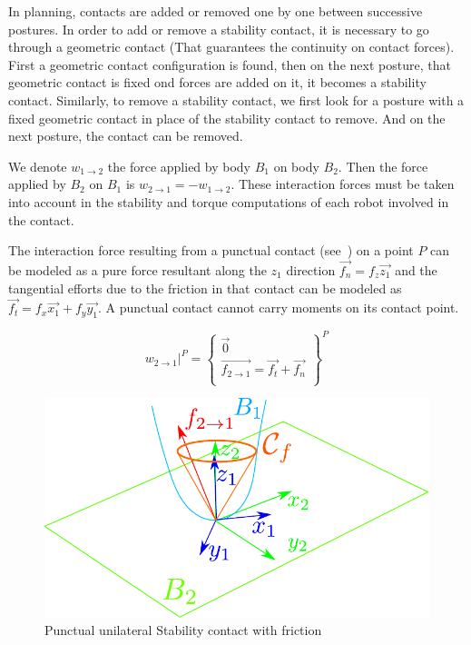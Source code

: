 In planning, contacts are added or removed one by one between successive postures.
In order to add or remove a stability contact, it is necessary to go through a geometric contact (That guarantees the continuity on contact forces).
First a geometric contact configuration is found, then on the next posture, that geometric contact is fixed ond forces are added on it, it becomes a stability contact.
Similarly, to remove a stability contact, we first look for a posture with a fixed geometric contact in place of the stability contact to remove.
And on the next posture, the contact can be removed.

We denote $w_{1\rightarrow 2}$ the force applied by body $B_1$ on body $B_2$. Then the force applied by $B_2$ on $B_1$ is $w_{2\rightarrow 1} = -w_{1\rightarrow 2}$.
These interaction forces must be taken into account in the stability and torque computations of each robot involved in the contact.

The interaction force resulting from a punctual contact (see~) on a point $P$ can be modeled as a pure force resultant along the $z_1$ direction $\vec{f_n} = f_z \vec{z_1}$ and the tangential efforts due to the friction in that contact can be modeled as $\vec{f_t} = f_x \vec{x_1} + f_y \vec{y_1}$. A punctual contact cannot carry moments on its contact point.

\begin{equation}
\label{eq:punctual_force}
\left. w_{2\rightarrow 1}\right|^P = \left\{
  \begin{array}{l}
    \vec{0} \\
    \overrightarrow{f_{2\rightarrow 1}} = \vec{f_t} + \vec{f_n} \\
  \end{array}
  \right\}^P
\end{equation}

\begin{figure}[htpb]
  \centering
  \includegraphics[width=0.6\linewidth]{frictionCone.pdf}
  \caption{Punctual unilateral Stability contact with friction}
\label{fig:frictionCone}
\end{figure}

